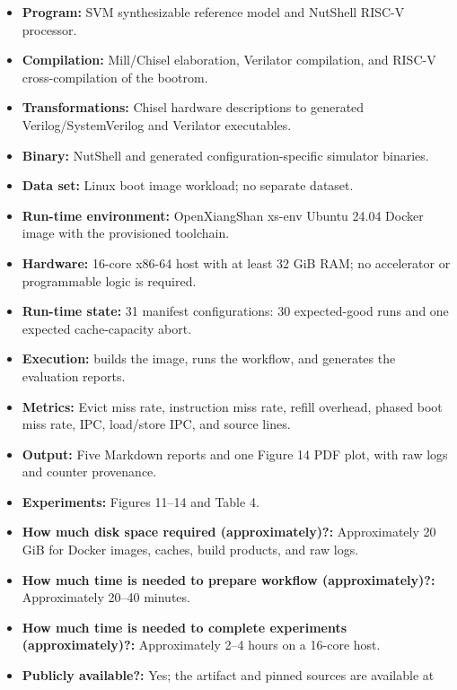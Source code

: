 \documentclass{sigplanconf}
\begin{document}
\begin{itemize}
  \item \textbf{Program:} SVM synthesizable reference model and NutShell
        RISC-V processor.
  \item \textbf{Compilation:} Mill/Chisel elaboration, Verilator compilation,
        and RISC-V cross-compilation of the bootrom.
  \item \textbf{Transformations:} Chisel hardware descriptions to generated
        Verilog/SystemVerilog and Verilator executables.
  \item \textbf{Binary:} NutShell  and generated
        configuration-specific simulator binaries.
  \item \textbf{Data set:} Linux boot image workload; no separate dataset.
  \item \textbf{Run-time environment:} OpenXiangShan xs-env Ubuntu 24.04
        Docker image with the provisioned toolchain.
  \item \textbf{Hardware:} 16-core x86-64 host with at least 32 GiB RAM;
        no accelerator or programmable logic is required.
  \item \textbf{Run-time state:} 31 manifest configurations: 30 expected-good
        runs and one expected cache-capacity abort.
  \item \textbf{Execution:}  builds the image, runs the
        workflow, and generates the evaluation reports.
  \item \textbf{Metrics:} Evict miss rate, instruction miss rate, refill
        overhead, phased boot miss rate, IPC, load/store IPC, and source lines.
  \item \textbf{Output:} Five Markdown reports and one Figure 14 PDF plot,
        with raw logs and counter provenance.
  \item \textbf{Experiments:} Figures 11--14 and Table 4.
  \item \textbf{How much disk space required (approximately)?:} Approximately
        20 GiB for Docker images, caches, build products, and raw logs.
  \item \textbf{How much time is needed to prepare workflow (approximately)?:}
        Approximately 20--40 minutes.
  \item \textbf{How much time is needed to complete experiments (approximately)?:}
        Approximately 2--4 hours on a 16-core host.
  \item \textbf{Publicly available?:} Yes; the artifact and pinned sources are
        available at

\end{itemize}
\end{document}
